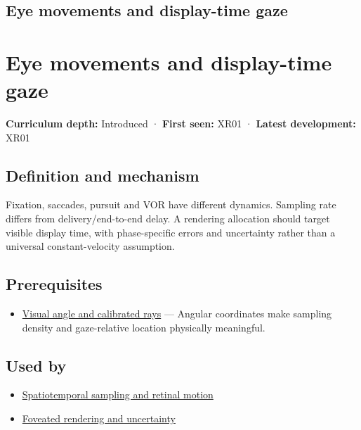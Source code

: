 \hypertarget{appendix-a6f2c4fe1996}{}
\section*{Eye movements and display-time gaze}
\chapter{Eye movements and display-time gaze}\label{appendix-a6f2c4fe1996-eye-movements-and-display-time-gaze}

\textbf{Curriculum depth:} Introduced · \textbf{First seen:} XR01 · \textbf{Latest development:} XR01

\section{Definition and mechanism}\label{appendix-a6f2c4fe1996-definition-and-mechanism}

Fixation, saccades, pursuit and VOR have different dynamics. Sampling rate differs from delivery/end-to-end delay. A rendering allocation should target visible display time, with phase-specific errors and uncertainty rather than a universal constant-velocity assumption.

\section{Prerequisites}\label{appendix-a6f2c4fe1996-prerequisites}

\begin{itemize}
\tightlist
\item
  \hyperref[appendix-7d356c396d1a]{Visual angle and calibrated rays} --- Angular coordinates make sampling density and gaze-relative location physically meaningful.
\end{itemize}

\section{Used by}\label{appendix-a6f2c4fe1996-used-by}

\begin{itemize}
\tightlist
\item
  \hyperref[appendix-70895739febb]{Spatiotemporal sampling and retinal motion}
\item
  \hyperref[appendix-5878b813b732]{Foveated rendering and uncertainty}
\end{itemize}

